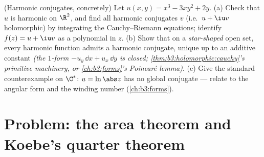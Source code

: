 \begin{exercise}[$\star\star$]\label{exo:b3:conformal:12}
(Harmonic conjugates, concretely) Let $u(x, y) = x^3 - 3xy^2
+ 2y$.
(a) Check that $u$ is harmonic on $\R^2$, and find all
harmonic conjugates $v$ (i.e.\ $u + \iu v$ holomorphic) by
integrating the Cauchy--Riemann equations; identify $f(z) =
u + \iu v$ as a polynomial in $z$.
(b) Show that on a \emph{star-shaped} open set, every
harmonic function admits a harmonic conjugate, unique up to
an additive constant \emph{(the $1$-form $-u_y\,\dd x +
u_x\,\dd y$ is closed; \cref{thm:b3:holomorphic:cauchy}'s
primitive machinery, or \cref{ch:b3:forms}'s Poincar\'e
lemma)}.
(c) Give the standard counterexample on
$\C^*$: $u = \ln\abs z$ has no global conjugate --- relate
to the angular form and the winding number
(\cref{ch:b3:forms}).
\end{exercise}

\section{Problem: the area theorem and Koebe's quarter
theorem}


